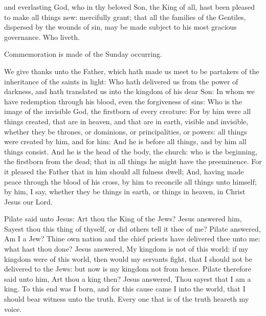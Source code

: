 \collect
{} and everlasting God, who in thy beloved Son, the King of all, hast been pleased to make all things new: mercifully grant; that all the families of the Gentiles, dispersed by the wounds of sin, may be made subject to his most gracious governance. Who liveth.
\begin{rubric}
    Commemoration is made of the Sunday occurring.
\end{rubric}

 We give thanks unto the Father, which hath made us meet to be partakers of the inheritance of the saints in light: Who hath delivered us from the power of darkness, and hath translated us into the kingdom of his dear Son: In whom we have redemption through his blood, even the forgiveness of sins: Who is the image of the invisible God, the firstborn of every creature: For by him were all things created, that are in heaven, and that are in earth, visible and invisible, whether they be thrones, or dominions, or principalities, or powers: all things were created by him, and for him: And he is before all things, and by him all things consist. And he is the head of the body, the church: who is the beginning, the firstborn from the dead; that in all things he might have the preeminence. For it pleased the Father that in him should all fulness dwell; And, having made peace through the blood of his cross, by him to reconcile all things unto himself; by him, I say, whether they be things in earth, or things in heaven, in Christ Jesus our Lord.



 Pilate said unto Jesus: Art thou the King of the Jews? Jesus answered him, Sayest thou this thing of thyself, or did others tell it thee of me? Pilate answered, Am I a Jew? Thine own nation and the chief priests have delivered thee unto me: what hast thou done? Jesus answered, My kingdom is not of this world: if my kingdom were of this world, then would my servants fight, that I should not be delivered to the Jews: but now is my kingdom not from hence. Pilate therefore said unto him, Art thou a king then? Jesus answered, Thou sayest that I am a king. To this end was I born, and for this cause came I into the world, that I should bear witness unto the truth. Every one that is of the truth heareth my voice.

